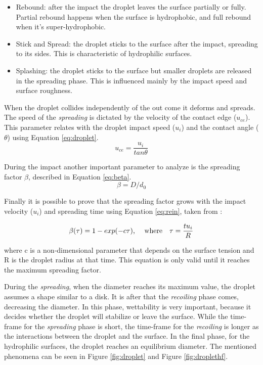 \begin{itemize}
\item Rebound: after the impact the droplet leaves the surface partially or fully. Partial rebound happens when the surface is hydrophobic, and full rebound when it's super-hydrophobic.
\item Stick and Spread: the droplet sticks to the surface after the impact, spreading to its sides. This is characteristic of hydrophilic surfaces.
\item Splashing: the droplet sticks to the surface but smaller droplets are released in the spreading phase. This is influenced mainly by the impact speed and surface roughness.
\end{itemize}

\par When the droplet collides independently of the out come it deforms and spreads. The speed of the \textit{spreading} is dictated by the velocity of the contact edge ($u_{ce}$). This parameter relates with the droplet impact speed ($u_i$) and the contact angle ($\theta$) using Equation \ref{eq:droplet}.
\begin{equation} \label{eq:droplet}
u_{ce}=\frac{u_i}{tan \theta}
\end{equation}

\par During the impact another important parameter to analyze is the spreading factor $\beta$, described in Equation \ref{eq:beta}.
\begin{equation}\label{eq:beta}
\beta=D/d_0
\end{equation}

\par Finally it is possible to prove that the spreading factor grows with the impact velocity ($u_i$) and spreading time using Equation \ref{eq:rein}, taken from \cite{rein1993phenomena}:

\begin{equation}\label{eq:rein}
\beta(\tau)=1-exp(-c\tau) \text{, \quad where} \quad \tau=\frac{t u_i}{R}
\end{equation}

where c is a non-dimensional parameter that depends on the surface tension and R is the droplet radius at that time. This equation is only valid until it reaches the maximum spreading factor.

\par During the \textit{spreading}, when the diameter reaches its maximum value, the droplet assumes a shape similar to a disk. It is after that the \textit{recoiling} phase comes, decreasing the diameter. In this phase, wettability is very important, because it decides whether the droplet will stabilize or leave the surface. While the time-frame for the \textit{spreading} phase is short, the time-frame for the \textit{recoiling} is longer as the interactions between the droplet and the surface. In the final phase, for the hydrophilic surfaces, the droplet reaches an equilibrium diameter. The mentioned phenomena can be seen in Figure \ref{fig:droplet} and Figure \ref{fig:droplethf}.

